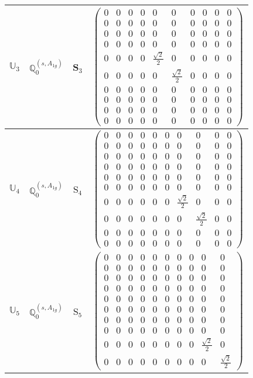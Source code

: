 \documentclass[fleqn,10pt,landscape]{article}
\begin{document}
\begin{itemize}
\begin{center}
\begin{longtable}{c|c|c|c}
$ \mathbb{U}_{3} $ & $\mathbb{Q}_{0}^{(s,A_{1g})}$ & S$_{3}$ & $\begin{pmatrix} 0 & 0 & 0 & 0 & 0 & 0 & 0 & 0 & 0 & 0 \\ 0 & 0 & 0 & 0 & 0 & 0 & 0 & 0 & 0 & 0 \\ 0 & 0 & 0 & 0 & 0 & 0 & 0 & 0 & 0 & 0 \\ 0 & 0 & 0 & 0 & 0 & 0 & 0 & 0 & 0 & 0 \\ 0 & 0 & 0 & 0 & \frac{\sqrt{2}}{2} & 0 & 0 & 0 & 0 & 0 \\ 0 & 0 & 0 & 0 & 0 & \frac{\sqrt{2}}{2} & 0 & 0 & 0 & 0 \\ 0 & 0 & 0 & 0 & 0 & 0 & 0 & 0 & 0 & 0 \\ 0 & 0 & 0 & 0 & 0 & 0 & 0 & 0 & 0 & 0 \\ 0 & 0 & 0 & 0 & 0 & 0 & 0 & 0 & 0 & 0 \\ 0 & 0 & 0 & 0 & 0 & 0 & 0 & 0 & 0 & 0 \end{pmatrix}$ \\ \hline
$ \mathbb{U}_{4} $ & $\mathbb{Q}_{0}^{(s,A_{1g})}$ & S$_{4}$ & $\begin{pmatrix} 0 & 0 & 0 & 0 & 0 & 0 & 0 & 0 & 0 & 0 \\ 0 & 0 & 0 & 0 & 0 & 0 & 0 & 0 & 0 & 0 \\ 0 & 0 & 0 & 0 & 0 & 0 & 0 & 0 & 0 & 0 \\ 0 & 0 & 0 & 0 & 0 & 0 & 0 & 0 & 0 & 0 \\ 0 & 0 & 0 & 0 & 0 & 0 & 0 & 0 & 0 & 0 \\ 0 & 0 & 0 & 0 & 0 & 0 & 0 & 0 & 0 & 0 \\ 0 & 0 & 0 & 0 & 0 & 0 & \frac{\sqrt{2}}{2} & 0 & 0 & 0 \\ 0 & 0 & 0 & 0 & 0 & 0 & 0 & \frac{\sqrt{2}}{2} & 0 & 0 \\ 0 & 0 & 0 & 0 & 0 & 0 & 0 & 0 & 0 & 0 \\ 0 & 0 & 0 & 0 & 0 & 0 & 0 & 0 & 0 & 0 \end{pmatrix}$ \\ \hline
$ \mathbb{U}_{5} $ & $\mathbb{Q}_{0}^{(s,A_{1g})}$ & S$_{5}$ & $\begin{pmatrix} 0 & 0 & 0 & 0 & 0 & 0 & 0 & 0 & 0 & 0 \\ 0 & 0 & 0 & 0 & 0 & 0 & 0 & 0 & 0 & 0 \\ 0 & 0 & 0 & 0 & 0 & 0 & 0 & 0 & 0 & 0 \\ 0 & 0 & 0 & 0 & 0 & 0 & 0 & 0 & 0 & 0 \\ 0 & 0 & 0 & 0 & 0 & 0 & 0 & 0 & 0 & 0 \\ 0 & 0 & 0 & 0 & 0 & 0 & 0 & 0 & 0 & 0 \\ 0 & 0 & 0 & 0 & 0 & 0 & 0 & 0 & 0 & 0 \\ 0 & 0 & 0 & 0 & 0 & 0 & 0 & 0 & 0 & 0 \\ 0 & 0 & 0 & 0 & 0 & 0 & 0 & 0 & \frac{\sqrt{2}}{2} & 0 \\ 0 & 0 & 0 & 0 & 0 & 0 & 0 & 0 & 0 & \frac{\sqrt{2}}{2} \end{pmatrix}$ \\ \hline

\end{longtable}
\end{center}
\end{itemize}
\end{document}
